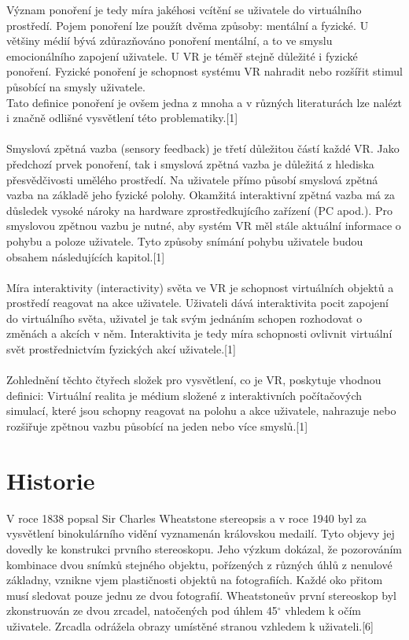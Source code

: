 \documentclass[a4paper, 12pt]{report}
\begin{document}
Význam ponoření je tedy míra jakéhosi vcítění se uživatele do virtuálního prostředí. Pojem ponoření lze použít dvěma způsoby: mentální a fyzické. U většiny médií bývá zdůrazňováno ponoření mentální, a to ve smyslu emocionálního zapojení uživatele. U VR je téměř stejně důležité i fyzické ponoření. Fyzické ponoření je schopnost systému VR nahradit nebo rozšířit stimul působící na smysly uživatele.\\
Tato definice ponoření je ovšem jedna z mnoha a v různých literaturách lze nalézt i značně odlišné vysvětlení této problematiky.[1]\\
\\
Smyslová zpětná vazba (sensory feedback) je třetí důležitou částí každé VR. Jako předchozí prvek ponoření, tak i smyslová zpětná vazba je důležitá z hlediska přesvědčivosti umělého prostředí. Na uživatele přímo působí smyslová zpětná vazba na základě jeho fyzické polohy. Okamžitá interaktivní zpětná vazba má za důsledek vysoké nároky na hardware zprostředkujícího zařízení (PC apod.). Pro smyslovou zpětnou vazbu je nutné, aby systém VR měl stále aktuální informace o pohybu a poloze uživatele. Tyto způsoby snímání pohybu uživatele budou obsahem následujících kapitol.[1]\\
\\
Míra interaktivity (interactivity) světa ve VR je schopnost virtuálních objektů a prostředí reagovat na akce uživatele. Uživateli dává interaktivita pocit zapojení do virtuálního světa, uživatel je tak svým jednáním schopen rozhodovat o změnách a akcích v něm. Interaktivita je tedy míra schopnosti ovlivnit virtuální svět prostřednictvím fyzických akcí uživatele.[1] \\
\\
Zohlednění těchto čtyřech složek pro vysvětlení, co je VR, poskytuje vhodnou definici: Virtuální realita je médium složené z interaktivních počítačových simulací, které jsou schopny reagovat na polohu a akce uživatele, nahrazuje nebo rozšiřuje 
zpětnou vazbu působící na jeden nebo více smyslů.[1]

\section{Historie}
V roce 1838 popsal Sir Charles Wheatstone stereopsis  a v roce 1940 byl za vysvětlení binokulárního vidění vyznamenán královskou medailí. Tyto objevy jej dovedly ke konstrukci prvního stereoskopu. Jeho výzkum dokázal, že pozorováním kombinace dvou snímků stejného objektu, pořízených z různých úhlů z nenulové základny, vznikne vjem plastičnosti objektů na fotografiích. Každé oko přitom musí sledovat pouze jednu ze dvou fotografií. Wheatstoneův první stereoskop byl zkonstruován ze dvou zrcadel, natočených pod úhlem 45$^\circ$ vhledem k očím uživatele. Zrcadla odrážela obrazy umístěné stranou vzhledem k uživateli.[6]
\end{document}

